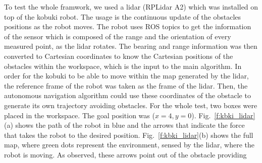 \documentclass[conference]{IEEEtran}
\begin{document}
To test the whole framwork, we used a lidar (RPLidar A2) which was installed on
top of the kobuki robot. The usage is the continuous update of the obstacles
positions as the robot moves.
The robot uses ROS topics to get the information of the sensor which is
composed of the range and the orientation of every measured point, as the lidar
rotates. The bearing and range information was then converted to Cartesian
coordinates to know the Cartesian positions of the obstacles within the
workspace, which is the input to the main algorithm. In order for the kobuki to
be able to move within the map generated by the lidar, the reference frame of
the robot was taken as the frame of the lidar. Then, the autonomous navigation
algorithm could use these coordinates of the obstacle to generate its own
trajectory avoiding obstacles. For the whole test, two boxes were placed in the
workspace. The goal position was ($x=4,y=0$). Fig.~\ref{f:kbki_lidar}(a) shows
the path of the robot in blue and the arrows that indicate the force that takes
the robot to the desired position. Fig.~\ref{f:kbki_lidar}(b) shows the full
map, where green dots represent the environment, sensed by the lidar, where the
robot is moving. As observed, these arrows point out of the obstacle providing
\end{document}
